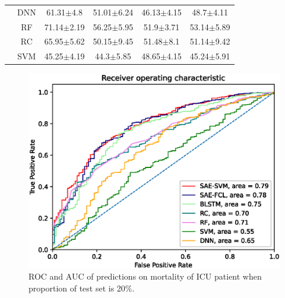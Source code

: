 \begin{table}
\begin{tabular}{c c cccc}
    & DNN & \multicolumn{1}{c}{61.31$\pm$4.8} & \multicolumn{1}{c}{51.01$\pm$6.24} & \multicolumn{1}{c}{46.13$\pm$4.15} & 48.7$\pm$4.11\\
    & RF & \multicolumn{1}{c}{71.14$\pm$2.19} & \multicolumn{1}{c}{56.25$\pm$5.95} & \multicolumn{1}{c}{51.9$\pm$3.71} & 53.14$\pm$5.89\\
    & RC & \multicolumn{1}{c}{65.95$\pm$5.62} & \multicolumn{1}{c}{50.15$\pm$9.45} & \multicolumn{1}{c}{51.48$\pm$8.1} & 51.14$\pm$9.42\\
    & SVM & \multicolumn{1}{c}{45.25$\pm$4.19} & \multicolumn{1}{c}{44.3$\pm$5.85} & \multicolumn{1}{c}{48.65$\pm$4.15} & 45.24$\pm$5.91\\
        \bottomrule
    \end{tabular}
\end{table}

\begin{figure}[h]
    \includegraphics[width=1.0\linewidth]{figures/larger/roc_curve-icu-larger.eps}
    \caption{ROC and AUC of predictions on mortality of ICU patient when proportion of test set is 20\%.} \label{fig: roc_curve ICU}
\end{figure}

